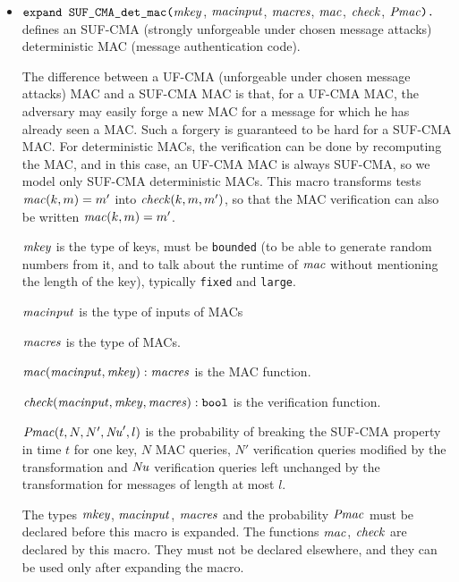 \documentclass{article}
\begin{document}
\begin{itemize}
\item $\texttt{expand SUF\_CMA\_det\_mac(}\mathit{mkey}$,
$  \mathit{macinput}$, $\mathit{macres}$, $\mathit{mac}$, $\mathit{check}$,
$  \mathit{Pmac}\texttt{).}$ defines an SUF-CMA (strongly unforgeable under chosen
  message attacks) deterministic MAC (message authentication code).

  The difference between a UF-CMA (unforgeable under chosen message
  attacks) MAC and a SUF-CMA MAC is that, for a UF-CMA MAC, the
  adversary may easily forge a new MAC for a message for which he has
  already seen a MAC. Such a forgery is guaranteed to be hard for a
  SUF-CMA MAC. For deterministic MACs, the verification can be done by
  recomputing the MAC, and in this case, an UF-CMA MAC is always
  SUF-CMA, so we model only SUF-CMA deterministic MACs. This macro
  transforms tests $\mathit{mac}(k,m) = m'$ into $\mathit{check}(k, m, m')$,
  so that the MAC verification can also be written
  $\mathit{mac}(k,m) = m'$.

  $\mathit{mkey}$ is the type of keys, must be \texttt{bounded} (to be
  able to generate random numbers from it, and to talk about the
  runtime of $\mathit{mac}$ without mentioning the length of the key),
  typically \texttt{fixed} and \texttt{large}.

   $\mathit{macinput}$ is the type of inputs of MACs

   $\mathit{macres}$ is the type of MACs.

   $\mathit{mac}(\mathit{macinput}, \mathit{mkey}): \mathit{macres}$ is the MAC function.

   $\mathit{check}(\mathit{macinput}, \mathit{mkey}, \mathit{macres}): \texttt{bool}$ is the verification function.

   $\mathit{Pmac}(t, N, N', \mathit{Nu}', l)$ is the probability of breaking the SUF-CMA
   property in time $t$ for one key, $N$ MAC queries, $N'$ verification
   queries modified by the transformation and $\mathit{Nu}$ verification
   queries left unchanged by the transformation for messages of length at most $l$.

   The types $\mathit{mkey}$, $\mathit{macinput}$,
   $\mathit{macres}$ and the probability $\mathit{Pmac}$ must be declared
   before this macro is expanded. The functions 
   $\mathit{mac}$, $\mathit{check}$ are declared by this macro. They must not
   be declared elsewhere, and they can be used only after expanding
   the macro.


\end{itemize}
\end{document}
